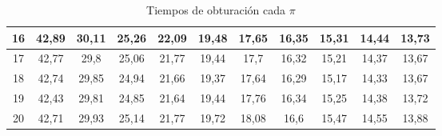 \documentclass[a4paper]{article}
\begin{document}
\begin{table}[!ht]
\begin{tabular}{|c|c|c|c|c|c|c|c|c|c|c|}
        16 & 42,89 & 30,11 & 25,26 & 22,09 & 19,48 & 17,65 & 16,35 & 15,31 & 14,44 & 13,73
\\ \hline
        17 & 42,77 & 29,8 & 25,06 & 21,77 & 19,44 & 17,7 & 16,32 & 15,21 & 14,37 & 13,67
\\ \hline
        18 & 42,74 & 29,85 & 24,94 & 21,66 & 19,37 & 17,64 & 16,29 & 15,17 & 14,33 & 13,67
\\ \hline
        19 & 42,43 & 29,81 & 24,85 & 21,64 & 19,44 & 17,76 & 16,34 & 15,25 & 14,38 & 13,72
\\ \hline
        20  & 42,71  & 29,93  & 25,14  & 21,77  & 19,72  & 18,08  & 16,6  & 15,47  & 14,55  & 13,88
\\ \hline
    \end{tabular}
    \caption{Tiempos de obturación cada $\pi$}
\end{table}
\end{document}
